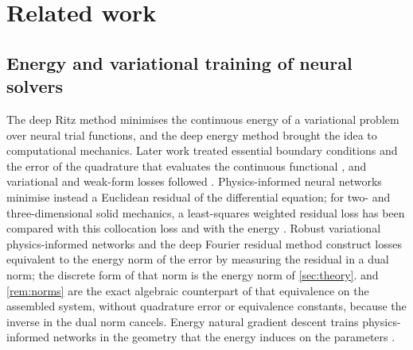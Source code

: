 \section{Related work}\label{sec:related}

\subsection{Energy and variational training of neural solvers}
The deep Ritz method \cite{EYu2018} minimises the continuous energy of a variational problem
over neural trial functions, and the deep energy method \cite{Samaniego2020} brought the idea to computational mechanics. Later work treated essential boundary conditions
\cite{LiaoMing2021} and the error of the quadrature that evaluates the continuous functional
\cite{LiuCaiRamani2023}, and variational and weak-form losses followed
\cite{Kharazmi2021,Wang2022CENN,Wang2025KINN,Manav2024}. Physics-informed neural networks
\cite{Raissi2019} minimise instead a Euclidean residual of the differential equation; for
two- and three-dimensional solid mechanics, a least-squares weighted residual loss has been
compared with this collocation loss and with the energy \cite{Bai2023LSWR}. Robust
variational physics-informed networks \cite{Rojas2024} and the deep Fourier residual method
\cite{Taylor2023DFR,Taylor2024} construct losses equivalent to the energy norm of the error by measuring the residual in a
dual norm; the discrete form of that norm is the energy norm of \cref{sec:theory}.
 and \cref{rem:norms} are the exact algebraic counterpart of that
equivalence on the assembled system, without quadrature error or equivalence constants,
because the inverse in the dual norm cancels. Energy natural gradient descent trains
physics-informed networks in the geometry that the energy induces on the parameters
\cite{MullerZeinhofer2023}.

